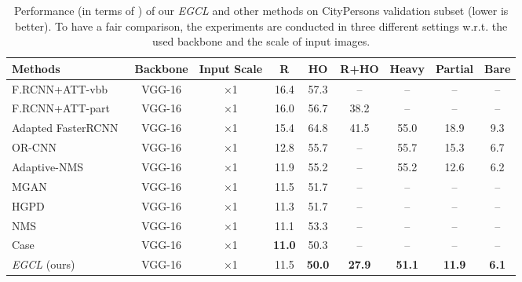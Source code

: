 \documentclass[journal]{IEEEtran}
\begin{document}
\begin{table*}[!t]

\centering
\caption{Performance (in terms of ) of our \emph{EGCL} and other methods on CityPersons validation subset (lower is better). To have a fair comparison, the experiments are conducted in three different settings w.r.t. the used backbone and the scale of input images.}
\renewcommand\arraystretch{1.5} 
\begin{tabular}{l| c c c c c c c c}
\toprule
\multicolumn{1}{l|}{Methods} &\multicolumn{1}{c}{Backbone} &\multicolumn{1}{c}{Input Scale} &\multicolumn{1}{c}{\textbf{R}}& \multicolumn{1}{c}{\textbf{HO}}  & \multicolumn{1}{c}{\textbf{R+HO}} & \multicolumn{1}{c}{\textbf{Heavy}} & \multicolumn{1}{c}{\textbf{Partial}} & \multicolumn{1}{c}{\textbf{Bare}}\\
\midrule
F.RCNN+ATT-vbb~\cite{zhang2018occluded}  & VGG-16 & ×1 &  16.4   &  57.3     &   --  & -- & -- & -- \\
F.RCNN+ATT-part~\cite{zhang2018occluded}  & VGG-16 & ×1 &  16.0   &  56.7     &   38.2  & -- & -- & -- \\
Adapted FasterRCNN~\cite{zhang2017citypersons}  & VGG-16        & ×1          &  15.4                                &     64.8                             &   41.5      & 55.0 &18.9 &  9.3                            \\ 
OR-CNN~\cite{zhang2018occlusion} & VGG-16           & ×1        &  12.8   &    55.7     &   --   & 55.7 & 15.3 &  6.7                            \\ 
Adaptive-NMS~\cite{liu2019adaptive} & VGG-16   & ×1        &   11.9         &        55.2        &  --      & 55.2 &12.6 & 6.2                              \\ 
MGAN~\cite{pang2019mask} & VGG-16   & ×1        &   11.5         &        51.7        &  --      & -- &-- & --                             \\ 
HGPD~\cite{li2020learning} & VGG-16   & ×1        &   11.3         &        51.7        &  --      & -- &-- & --                             \\
NMS~\cite{huang2020nms} & VGG-16   & ×1        &   11.1         &        53.3      &  --      & -- &-- & --                             \\
Case~\cite{xie2020count} & VGG-16   & ×1        &   \textbf{11.0}         &        50.3      &  --      &  --      & --      &  --                                 \\
\emph{EGCL} (ours) & VGG-16  & ×1        & 11.5                                 &  \textbf{50.0}                                &   \textbf{27.9}      & \textbf{51.1}& \textbf{11.9} &  \textbf{6.1}  \\

\end{tabular}
\end{table*}
\end{document}

